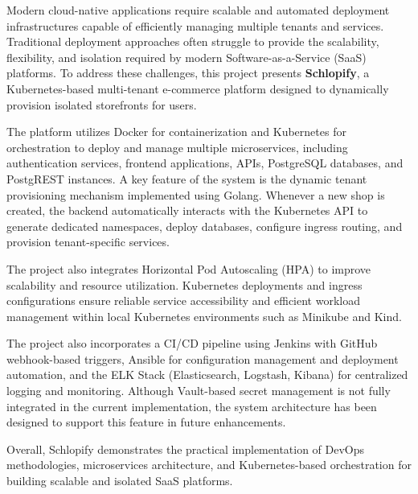 \documentclass[12pt,a4paper]{report}
\begin{document}
Modern cloud-native applications require scalable and automated deployment infrastructures capable of efficiently managing multiple tenants and services. Traditional deployment approaches often struggle to provide the scalability, flexibility, and isolation required by modern Software-as-a-Service (SaaS) platforms. To address these challenges, this project presents \textbf{Schlopify}, a Kubernetes-based multi-tenant e-commerce platform designed to dynamically provision isolated storefronts for users.

The platform utilizes Docker for containerization and Kubernetes for orchestration to deploy and manage multiple microservices, including authentication services, frontend applications, APIs, PostgreSQL databases, and PostgREST instances. A key feature of the system is the dynamic tenant provisioning mechanism implemented using Golang. Whenever a new shop is created, the backend automatically interacts with the Kubernetes API to generate dedicated namespaces, deploy databases, configure ingress routing, and provision tenant-specific services.

The project also integrates Horizontal Pod Autoscaling (HPA) to improve scalability and resource utilization. Kubernetes deployments and ingress configurations ensure reliable service accessibility and efficient workload management within local Kubernetes environments such as Minikube and Kind.

The project also incorporates a CI/CD pipeline using Jenkins with GitHub webhook-based triggers, Ansible for configuration management and deployment automation, and the ELK Stack (Elasticsearch, Logstash, Kibana) for centralized logging and monitoring. Although Vault-based secret management is not fully integrated in the current implementation, the system architecture has been designed to support this feature in future enhancements.

Overall, Schlopify demonstrates the practical implementation of DevOps methodologies, microservices architecture, and Kubernetes-based orchestration for building scalable and isolated SaaS platforms.

\newpage












\end{document}
